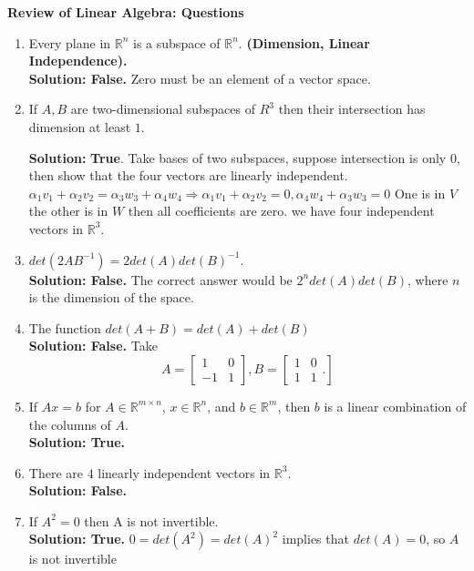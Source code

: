 \documentclass[14pt]{report}
\begin{document}
\textbf{{Review of Linear Algebra: Questions}}\\
\thispagestyle{empty}


\begin{enumerate}
\item Every plane in $\mathbb{R}^n$ is a subspace of $\mathbb{R}^n$.\textbf{
  (Dimension, Linear Independence).}\\ 
\textbf{Solution: False.}  Zero must be an element of a vector space. 

\item  If $A,B$ are two-dimensional subspaces of $R^3$ then their intersection has
dimension at least $1$. 

\textbf{Solution:} \textbf{True}. Take bases of two subspaces, suppose intersection is only $0$, then show
that the four vectors are linearly independent.
$\alpha_1v_1+\alpha_2v_2=\alpha_3w_3+\alpha_4w_4\Rightarrow
\alpha_1v_1+\alpha_2v_2=0, \alpha_4w_4+\alpha_3w_3=0$ One is in $V$ the other
is in $W$ then all coefficients are zero. we have four independent vectors in
$\mathbb{R}^3$. 

\item $det(2AB^{-1})=2det(A)det(B)^{-1}$.\\
\textbf{Solution: False.} The correct answer would be $2^ndet(A)det(B)$, where $n$ is the dimension of the space. 

\item The function $det(A+B)=det(A)+det(B)$\\
\textbf{Solution: False.} Take \[ A= \left[\begin{array}{cc}1 & 0 \\ -1 & 1 \end{array} \right], B= \left[\begin{array}{cc}
1 & 0 \\ 1 & 1 \end{array}. \right]\]
  
\item If $Ax=b$ for $A \in \mathbb{R}^{m\times n}$, $x\in\mathbb{R}^n$, and  
 $b\in\mathbb{R}^m$, then $b$ is a linear combination of the columns of $A$.\\
\textbf{Solution: True.} 

\item There are $4$ linearly independent vectors in $\mathbb{R}^3$.\\ 
\textbf{Solution: False.} 

\item If $A^2=0$ then A is not invertible.\\
\textbf{Solution: True.} $0=det(A^2)=det(A)^2$ implies that $det(A)=0$, so $A$ is not invertible



\end{enumerate}
\end{document}
